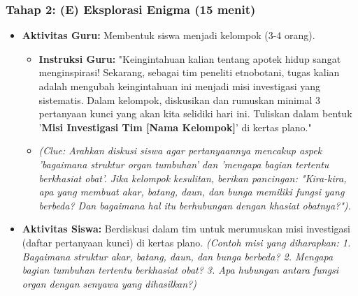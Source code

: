 \documentclass[a4paper,12pt]{article}
\begin{document}
\subsubsection{Tahap 2: (E) Eksplorasi Enigma (15 menit)}
\begin{itemize}
\item \textbf{Aktivitas Guru:} Membentuk siswa menjadi kelompok (3-4 orang).
    \begin{itemize}
    \item \textbf{Instruksi Guru:} "Keingintahuan kalian tentang apotek hidup sangat menginspirasi! Sekarang, sebagai tim peneliti etnobotani, tugas kalian adalah mengubah keingintahuan ini menjadi misi investigasi yang sistematis. Dalam kelompok, diskusikan dan rumuskan minimal 3 pertanyaan kunci yang akan kita selidiki hari ini. Tuliskan dalam bentuk '\textbf{Misi Investigasi Tim [Nama Kelompok]}' di kertas plano."
    \item \textit{(Clue: Arahkan diskusi siswa agar pertanyaannya mencakup aspek 'bagaimana struktur organ tumbuhan' dan 'mengapa bagian tertentu berkhasiat obat'. Jika kelompok kesulitan, berikan pancingan: "Kira-kira, apa yang membuat akar, batang, daun, dan bunga memiliki fungsi yang berbeda? Dan bagaimana hal itu berhubungan dengan khasiat obatnya?").}
    \end{itemize}
\item \textbf{Aktivitas Siswa:} Berdiskusi dalam tim untuk merumuskan misi investigasi (daftar pertanyaan kunci) di kertas plano. \textit{(Contoh misi yang diharapkan: 1. Bagaimana struktur akar, batang, daun, dan bunga berbeda? 2. Mengapa bagian tumbuhan tertentu berkhasiat obat? 3. Apa hubungan antara fungsi organ dengan senyawa yang dihasilkan?)}
\end{itemize}
\end{document}
